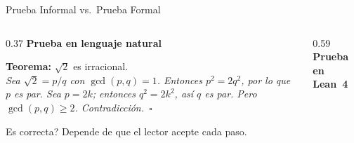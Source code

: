 \documentclass[aspectratio=169, 10pt]{beamer}
\begin{document}
\begin{frame}{Prueba Informal vs.\ Prueba Formal}
  \begin{columns}[T]
    \begin{column}{0.37\textwidth}
      {\color{cpGray}\bfseries\normalsize Prueba en lenguaje natural}
      \vspace{0.4cm}

      \colorbox{cpGray!10}{\parbox{\linewidth}{%
        \footnotesize
        \textbf{Teorema:} $\sqrt{2}$ es irracional.\\[0.4em]
        \itshape
        Sea $\sqrt{2} = p/q$ con $\gcd(p,q)=1$.
        Entonces $p^2 = 2q^2$, por lo que $p$ es par.
        Sea $p=2k$; entonces $q^2=2k^2$, as\'{i} $q$ es par.
        Pero $\gcd(p,q)\geq 2$. Contradicci\'{o}n.~$\square$
      }}\par\vspace{0.4cm}
      {\small\color{cpGray}\raggedright\textquestiondown Es correcta?
      Depende de que el lector acepte cada paso.}
    \end{column}
    \begin{column}{0.59\textwidth}
      {\color{leanpurple}\bfseries\normalsize Prueba en Lean~4}
      \vspace{0.4cm}


\end{column}
\end{columns}
\end{frame}
\end{document}
